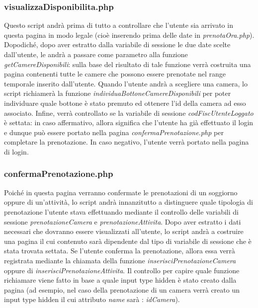 \documentclass [a4paper, 12pt]{book}
\begin{document}
\subsubsection{visualizzaDisponibilita.php}
Questo script andrà prima di tutto a controllare che l'utente sia arrivato in questa pagina in modo legale (cioè inserendo prima delle date in \textit{prenotaOra.php}). Dopodiché, dopo aver estratto dalla variabile di sessione le due date scelte dall'utente, le andrà a passare come parametro alla funzione \textit{getCamereDisponibili}: sulla base del risultato di tale funzione verrà costruita una pagina contenenti tutte le camere che possono essere prenotate nel range temporale inserito dall'utente. Quando l'utente andrà a scegliere una camera, lo script richiamerà la funzione \textit{individuaBottoneCamereDisponibili} per poter individuare quale bottone è stato premuto ed ottenere l'id della camera ad esso associato. Infine, verrà controllato se la variabile di sessione \textit{codFiscUtenteLoggato} è settata: in caso affermativo, allora significa che l'utente ha già effettuato il login e dunque può essere portato nella pagina \textit{confermaPrenotazione.php} per completare la prenotazione. In caso negativo, l'utente verrà portato nella pagina di login.

\subsubsection{confermaPrenotazione.php}
Poiché in questa pagina verranno confermate le prenotazioni di un soggiorno oppure di un'attività, lo script andrà innanzitutto a distinguere quale tipologia di prenotazione l'utente stava effettuando mediante il controllo delle variabili di sessione \textit{prenotazioneCamera} e \textit{prenotazioneAttivita}. Dopo aver estratto i dati necessari che dovranno essere visualizzati all'utente, lo script andrà a costruire una pagina il cui contenuto sarà dipendente dal tipo di variabile di sessione che è stata trovata settata. Se l'utente conferma la prenotazione, allora essa verrà registrata mediante la chiamata della funzione \textit{inserisciPrenotazioneCamera} oppure di \textit{inserisciPrenotazioneAttivita}. Il controllo per capire quale funzione richiamare viene fatto in base a quale input type hidden è stato creato dalla pagina (ad esempio, nel caso della prenotazione di un camera verrà creato un input type hidden  il cui attributo \textit{name} sarà : \textit{idCamera}).
\end{document}
